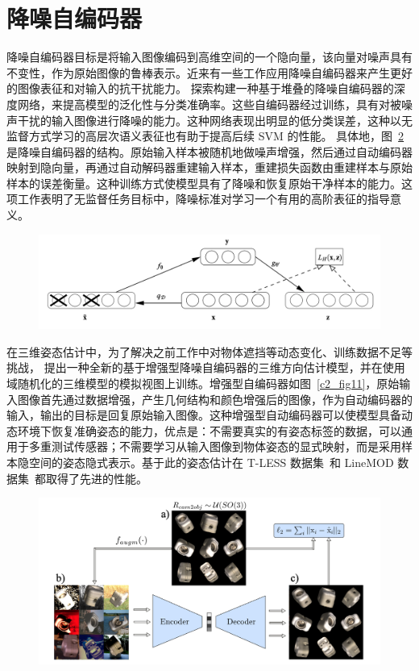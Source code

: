 \section{降噪自编码器}
降噪自编码器目标是将输入图像编码到高维空间的一个隐向量，该向量对噪声具有不变性，作为原始图像的鲁棒表示。近来有一些工作应用降噪自编码器来产生更好的图像表征和对输入的抗干扰能力。
\citet{vincent2010stacked} 探索构建一种基于堆叠的降噪自编码器的深度网络，来提高模型的泛化性与分类准确率。这些自编码器经过训练，具有对被噪声干扰的输入图像进行降噪的能力。这种网络表现出明显的低分类误差，这种以无监督方式学习的高层次语义表征也有助于提高后续 SVM 的性能。
具体地，图~\ref{c2_fig10}是降噪自编码器的结构。原始输入样本被随机地做噪声增强，然后通过自动编码器映射到隐向量，再通过自动解码器重建输入样本，重建损失函数由重建样本与原始样本的误差衡量。这种训练方式使模型具有了降噪和恢复原始干净样本的能力。这项工作表明了无监督任务目标中，降噪标准对学习一个有用的高阶表征的指导意义。
    \begin{figure}[tbp]
        \centering 
        \includegraphics[width=1.0\textwidth]{img/c2/rel_b4.png}
        \label{c2_fig10}
    \end{figure}

在三维姿态估计中，为了解决之前工作中对物体遮挡等动态变化、训练数据不足等挑战，\citet{Sundermeyer} 提出一种全新的基于增强型降噪自编码器的三维方向估计模型，并在使用域随机化的三维模型的模拟视图上训练。增强型自编码器如图~\ref{c2_fig11}，原始输入图像首先通过数据增强，产生几何结构和颜色增强后的图像，作为自动编码器的输入，输出的目标是回复原始输入图像。这种增强型自动编码器可以使模型具备动态环境下恢复准确姿态的能力，优点是：不需要真实的有姿态标签的数据，可以通用于多重测试传感器；不需要学习从输入图像到物体姿态的显式映射，而是采用样本隐空间的姿态隐式表示。基于此的姿态估计在 T-LESS 数据集~\citep{hodan2017t}和 LineMOD 数据集~\citep{hinterstoisser2011multimodal}都取得了先进的性能。
    \begin{figure}[tbp]
        \centering 
        \includegraphics[width=1.0\textwidth]{img/c2/rel_b5.png}
        \label{c2_fig10}
    \end{figure}

